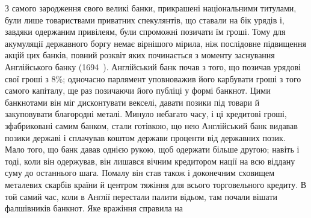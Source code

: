 З самого зародження свого великі банки, прикрашені національними титулами, були лише товариствами
приватних спекулянтів, що ставали на бік урядів і, завдяки одержаним привілеям, були спроможні
позичати їм гроші. Тому для акумуляції
державного боргу немає вірнішого мірила, ніж послідовне підвищення акцій цих банків, повний розквіт
яких починається з моменту заснування Англійського банку (1694~). Англійський банк почав з того,
що позичав урядові свої гроші з 8\%; одночасно
парлямент уповноважив його карбувати гроші з того самого капіталу, ще раз позичаючи його публіці у
формі банкнот. Цими банкнотами він міг дисконтувати векселі, давати позики під товари й закуповувати
благородні металі. Минуло небагато
часу, і ці кредитові гроші, зфабриковані самим банком, стали готівкою, що нею Англійський банк
видавав позики державі і сплачував коштом держави проценти від державних позик. Мало того, що банк
давав однією рукою, щоб одержати більше другою; навіть і тоді, коли він одержував, він лишався
вічним кредитором нації на всю віддану суму до останнього шага. Помалу він став також і доконечним
сховищем металевих скарбів країни й центром тяжіння для всього торговельного кредиту.
В той самий час, коли в Англії перестали палити відьом, там почали вішати фалшівників банкнот. Яке
вражіння справила на
\parbreak{}  %
